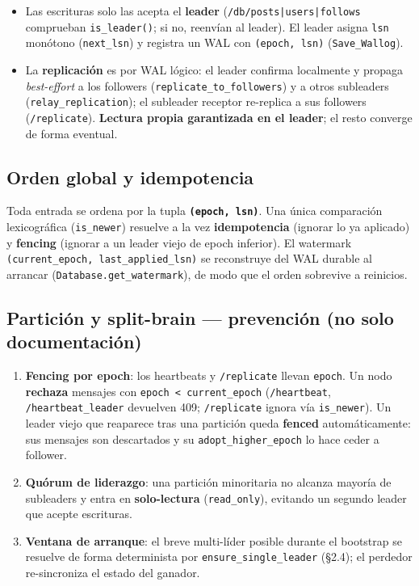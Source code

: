\documentclass[11pt]{article}
\begin{document}
\begin{itemize}
\item Las escrituras solo las acepta el \textbf{leader} (\texttt{/\allowbreak{}db/\allowbreak{}posts|users|follows} comprueban \texttt{is\_\allowbreak{}leader()}; si no, reenvían al leader). El leader asigna \texttt{lsn} monótono (\texttt{next\_\allowbreak{}lsn}) y registra un WAL con \texttt{(epoch, lsn)} (\texttt{Save\_\allowbreak{}Wallog}).
\item La \textbf{replicación} es por WAL lógico: el leader confirma localmente y propaga \emph{best-effort} a los followers (\texttt{replicate\_\allowbreak{}to\_\allowbreak{}followers}) y a otros subleaders (\texttt{relay\_\allowbreak{}replication}); el subleader receptor re-replica a sus followers (\texttt{/\allowbreak{}replicate}). \textbf{Lectura propia garantizada en el leader}; el resto converge de forma eventual.
\end{itemize}

\subsection{Orden global y idempotencia}

Toda entrada se ordena por la tupla \textbf{\texttt{(epoch, lsn)}}. Una única comparación lexicográfica (\texttt{is\_\allowbreak{}newer}) resuelve a la vez \textbf{idempotencia} (ignorar lo ya aplicado) y \textbf{fencing} (ignorar a un leader viejo de epoch inferior). El watermark \texttt{(current\_\allowbreak{}epoch, last\_\allowbreak{}applied\_\allowbreak{}lsn)} se reconstruye del WAL durable al arrancar (\texttt{Database.\allowbreak{}get\_\allowbreak{}watermark}), de modo que el orden sobrevive a reinicios.

\subsection{Partición y split-brain — prevención (no solo documentación)}

\begin{enumerate}
\item \textbf{Fencing por epoch}: los heartbeats y \texttt{/\allowbreak{}replicate} llevan \texttt{epoch}. Un nodo \textbf{rechaza} mensajes con \texttt{epoch < current\_\allowbreak{}epoch} (\texttt{/\allowbreak{}heartbeat}, \texttt{/\allowbreak{}heartbeat\_\allowbreak{}leader} devuelven 409; \texttt{/\allowbreak{}replicate} ignora vía \texttt{is\_\allowbreak{}newer}). Un leader viejo que reaparece tras una partición queda \textbf{fenced} automáticamente: sus mensajes son descartados y su \texttt{adopt\_\allowbreak{}higher\_\allowbreak{}epoch} lo hace ceder a follower.
\item \textbf{Quórum de liderazgo}: una partición minoritaria no alcanza mayoría de subleaders y entra en \textbf{solo-lectura} (\texttt{read\_\allowbreak{}only}), evitando un segundo leader que acepte escrituras.
\item \textbf{Ventana de arranque}: el breve multi-líder posible durante el bootstrap se resuelve de forma determinista por \texttt{ensure\_\allowbreak{}single\_\allowbreak{}leader} (§2.4); el perdedor re-sincroniza el estado del ganador.
\end{enumerate}
\end{document}
